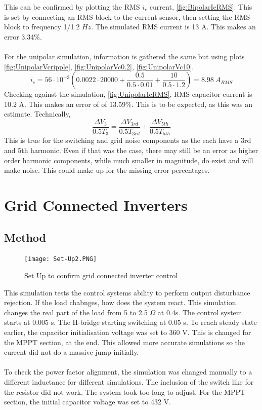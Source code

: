 \documentclass[12pt,twoside]{scrartcl}
\begin{document}
This can be confirmed by plotting the RMS $i_c$ current, \ref{fig:BipolarIcRMS}. This is set by connecting an RMS block to the current sensor,
then setting the RMS block to frequency 1/1.2 $Hz$. The simulated RMS current is 13 A. This makes an error 3.34\%.
\\
\\
\noindent
For the unipolar simulation, information is gathered the same but using plots \ref{fig:UnipolarVcripple}, \ref{fig:UnipolarVc0.2}, \ref{fig:UnipolarVc10}.
\begin{equation}
    i_c = 56\cdot 10^{-3}\left(0.0022\cdot 20000 + \dfrac{0.5}{0.5 \cdot 0.01} + \dfrac{10}{0.5 \cdot 1.2}\right) = 8.98 \: A_{RMS} \tag*{}
\end{equation}
Checking against the simulation, \ref{fig:UnipolarIcRMS}, RMS capacitor current is 10.2 A. This makes an error of of 13.59\%. 
This is to be expected, as this was an estimate. Technically,
\begin{equation}
    \dfrac{\Delta V_3}{0.5T_3} = \dfrac{\Delta V_{3rd}}{0.5T_{3rd}} + \dfrac{\Delta V_{5th}}{0.5T_{5th}}
\end{equation}
This is true for the switching and grid noise components as the each have a 3rd and 5th harmonic. Even if that was the case, there may still be an error as higher order harmonic components, while much smaller in magnitude, do exist and will make noise. This could make up for the missing error percentages. 
\newpage
\section{Grid Connected Inverters}
\subsection{Method}
\begin{figure}[htp]
    \centering
    \texttt{[image: Set-Up2.PNG]}
    \caption{Set Up to confirm grid connected inverter control}
    \label{fig:Real-Set-Up}
\end{figure}
\noindent
This simulation tests the control systems ability to perform output 
disturbance rejection. If the load chabnges,
how does the system react. This simulation changes the real part 
of the load from 5 to 2.5 $\Omega$ at 0.4s. The control system starts at
0.005 s. The H-bridge starting switching at 0.05 s. To reach steady 
state earlier, the capacitor initialisation voltage was set to 360 V. This is changed for the MPPT section, at the end. This allowed more accurate simulations so the current did not do a massive jump initially. 
\\
\\
\noindent
To check the power factor alignment, the simulation was changed manually to a different inductance for different simulations. The inclusion of the switch like for the resistor did not work. The system took too long to adjust. For the MPPT section, the initial capacitor voltage was set to 432 V.
\newpage
\end{document}
